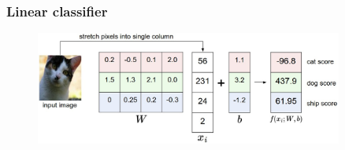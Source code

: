 \begin{frame}
	\frametitle{Linear classifier}

	\centering
	\begin{figure}
		\includegraphics[width=0.9\textwidth]{Pics/imagemap.jpg}
	\end{figure}

\end{frame}


